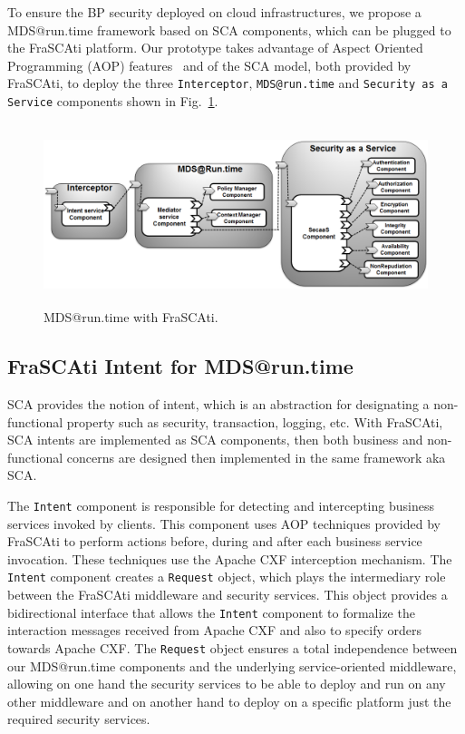 \documentclass[runningheads,a4paper]{llncs}
\begin{document}
To ensure the BP security deployed on cloud infrastructures, we propose a MDS@run.time framework based on SCA components, which can be plugged to the FraSCAti platform. 
Our prototype takes advantage of Aspect Oriented Programming (AOP) features~\cite{kiczales1997aspect} and of the SCA model, both provided by FraSCAti, to deploy the three \texttt{Interceptor}, \texttt{MDS@run.time} and \texttt{Security as a Service} components shown in Fig.~\ref{fig:composites}.
 
\begin{figure}[ht]  
\centering
\includegraphics[height=150pt, width=350pt]{composites2.png}
\caption{MDS@run.time with FraSCAti.}
\label{fig:composites}
\end{figure}

\subsection{FraSCAti Intent for MDS@run.time}
SCA provides the notion of intent, which is an abstraction for designating a non-functional property such as security, transaction, logging, etc.
With FraSCAti, SCA intents are implemented as SCA components, then both business and non-functional concerns are designed then implemented in the same framework aka SCA.

The \texttt{Intent} component is responsible for detecting and intercepting business services invoked by clients. This component uses AOP techniques provided by FraSCAti to perform actions before, during and after each business service invocation. 
These techniques use the Apache CXF interception mechanism. The \texttt{Intent} component creates a \texttt{Request} object, which plays the intermediary role between the FraSCAti middleware and security services. This object provides a bidirectional interface that allows the \texttt{Intent} component to formalize the interaction messages received from Apache CXF and also to specify orders towards Apache CXF. The \texttt{Request} object ensures a total independence between our MDS@run.time components and the underlying service-oriented middleware, allowing on one hand the security services to be able to deploy and run on any other middleware and on another hand to deploy on a specific platform just the required security services.
\end{document}
